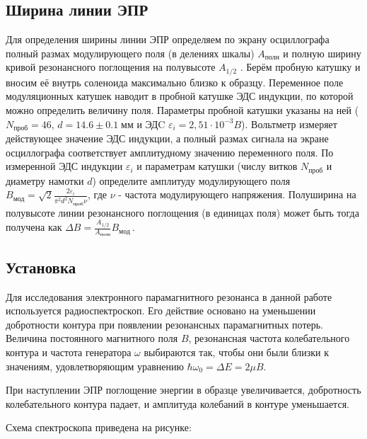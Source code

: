 \documentclass[a4paper,12pt]{article}
\begin{document}
\subsection*{Ширина линии ЭПР}
Для определения ширины линии ЭПР определяем по экрану осциллографа полный размах
модулирующего поля (в делениях шкалы) $A_\text{полн}$ и полную ширину кривой резонансного
поглощения на полувысоте $A_{1/2}$ . Берём пробную катушку и
вносим её внутрь соленоида максимально близко к образцу. Переменное поле
модуляционных катушек наводит в пробной катушке ЭДС индукции, по которой можно
определить величину поля. Параметры пробной катушки указаны на ней ($N_{проб} = 46$,
$d = 14.6 \pm 0.1 \; \text{мм}$ и ЭДC $\varepsilon_i=2,51\cdot 10^{-3} B$).
Вольтметр измеряет действующее значение ЭДС индукции, а полный размах
сигнала на экране осциллографа соответствует амплитудному значению переменного поля.
По измеренной ЭДС индукции $\varepsilon_i$ и параметрам катушки (числу витков $N_\text{проб}$ и диаметру
намотки $d$) определите амплитуду модулирующего поля $B_\text{мод} = \sqrt{2}\frac{2\varepsilon_i}{\pi^2 d^2N_\text{проб} \nu}$,
где $\nu$ - частота модулирующего напряжения. Полуширина на полувысоте линии резонансного
поглощения (в единицах поля) может быть тогда получена как $\Delta B=\frac{A_{1/2}}{A_\text{полн}}B_\text{мод}$\,.
\subsection*{Установка}
Для исследования электронного парамагнитного резонанса в данной работе используется
радиоспектроскоп. Его действие основано на уменьшении добротности контура при
появлении резонансных парамагнитных потерь.
Величина постоянного магнитного поля $B$, резонансная частота колебательного
контура и частота генератора $\omega$ выбираются так, чтобы они были близки к
значениям, удовлетворяющим уравнению $\hbar\omega_0=\Delta E=2\mu B$.

При наступлении ЭПР поглощение энергии в образце увеличивается, добротность
колебательного контура падает, и амплитуда колебаний в контуре уменьшается.

Схема спектроскопа приведена на рисунке:
\end{document}
